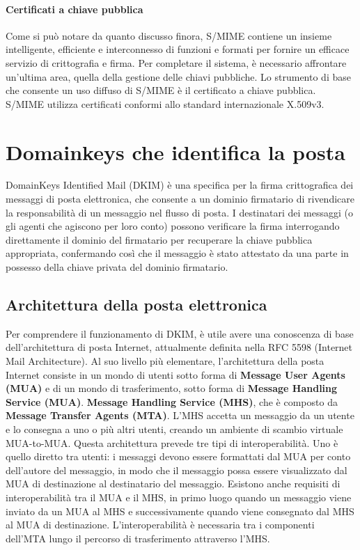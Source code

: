 \singlespacing

\paragraph{Certificati a chiave pubblica} Come si può notare da quanto discusso finora, S/MIME contiene un insieme intelligente, efficiente e interconnesso di funzioni e formati per fornire un efficace servizio di crittografia e firma. Per completare il sistema, è necessario affrontare un'ultima area, quella della gestione delle chiavi pubbliche. Lo strumento di base che consente un uso diffuso di S/MIME è il certificato a chiave pubblica. S/MIME utilizza certificati conformi allo standard internazionale X.509v3.

\section{Domainkeys che identifica la posta}
DomainKeys Identified Mail (DKIM) è una specifica per la firma crittografica dei messaggi di posta elettronica, che consente a un dominio firmatario di rivendicare la responsabilità di un messaggio nel flusso di posta. I destinatari dei messaggi (o gli agenti che agiscono per loro conto) possono verificare la firma interrogando direttamente il dominio del firmatario per recuperare la chiave pubblica appropriata, confermando così che il messaggio è stato attestato da una parte in possesso della chiave privata del dominio firmatario. 

\subsection{Architettura della posta elettronica}
Per comprendere il funzionamento di DKIM, è utile avere una conoscenza di base dell'architettura di posta Internet, attualmente definita nella RFC 5598 (Internet Mail Architecture). Al suo livello più elementare, l'architettura della posta Internet consiste in un mondo di utenti sotto forma di \textbf{Message User Agents (MUA)} e di un mondo di trasferimento, sotto forma di \textbf{Message Handling Service (MUA)}. \textbf{Message Handling Service (MHS)}, che è composto da \textbf{Message Transfer Agents (MTA)}. L'MHS accetta un messaggio da un utente e lo consegna a uno o più altri utenti, creando un ambiente di scambio virtuale MUA-to-MUA. Questa architettura prevede tre tipi di interoperabilità. Uno è quello diretto tra utenti: i messaggi devono essere formattati dal MUA per conto dell'autore del messaggio, in modo che il messaggio possa essere visualizzato dal MUA di destinazione al destinatario del messaggio. Esistono anche requisiti di interoperabilità tra il MUA e il MHS, in primo luogo quando un messaggio viene inviato da un MUA al MHS e successivamente quando viene consegnato dal MHS al MUA di destinazione. L'interoperabilità è necessaria tra i componenti dell'MTA lungo il percorso di trasferimento attraverso l'MHS.

